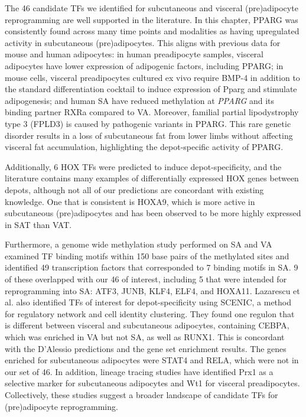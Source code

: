 The 46 candidate TFs we identified for subcutaneous and visceral (pre)adipocyte reprogramming are well supported in the literature. In this chapter, PPARG was consistently found across many time points and modalities as having upregulated activity in subcutaneous (pre)adipocytes. This aligns with previous data for mouse and human adipocytes: in human preadipocyte samples, visceral adipocytes have lower expression of adipogenic factors, including PPARG\cite{Mathur2022-fx}; in mouse cells, visceral preadipocytes cultured ex vivo require BMP-4 in addition to the standard differentiation cocktail to induce expression of Pparg and stimulate adipogenesis\cite{Macotela2012-wy}; and human SA have reduced methylation at \textit{PPARG} and its binding partner RXRa compared to VA\cite{Bradford2019-ps}. Moreover, familial partial lipodystrophy type 3 (FPLD3) is caused by pathogenic variants in PPARG\cite{Rutkowska2022-rs}. This rare genetic disorder results in a loss of subcutaneous fat from lower limbs without affecting visceral fat accumulation, highlighting the depot-specific activity of PPARG.

Additionally, 6 HOX TFs were predicted to induce depot-specificity, and the literature contains many examples of differentially expressed HOX genes between depots, although not all of our predictions are concordant with existing knowledge\cite{Ahn2019-us,Gesta2007-cp}. One that is consistent is HOXA9, which is more active in subcutaneous (pre)adipocytes and has been observed to be more highly expressed in SAT than VAT\cite{Tchkonia2007-xa}.  

Furthermore, a genome wide methylation study performed on SA and VA examined TF binding motifs within 150 base pairs of the methylated sites and identified 49 transcription factors that corresponded to 7 binding motifs in SA\cite{McAllan2023-qo}. 9 of these overlapped with our 46 of interest, including 5 that were intended for reprogramming into SA: ATF3, JUNB, KLF4, ELF4, and HOXA11. Lazarescu et al. also identified TFs of interest for depot-specificity using SCENIC, a method for regulatory network and cell identity clustering\cite{Aibar2017-wj}. They found one regulon that is different between visceral and subcutaneous adipocytes, containing CEBPA, which was enriched in VA but not SA, as well as RUNX1. This is concordant with the D'Alessio predictions and the gene set enrichment results. The genes enriched for subcutaneous adipocytes were STAT4 and RELA, which were not in our set of 46\cite{Lazarescu2025-ru}. In addition, lineage tracing studies have identified Prx1 as a selective marker for subcutaneous adipocytes and Wt1 for visceral preadipocytes\cite{Sakers2022-wb}. Collectively, these studies suggest a broader landscape of candidate TFs for (pre)adipocyte reprogramming.  

